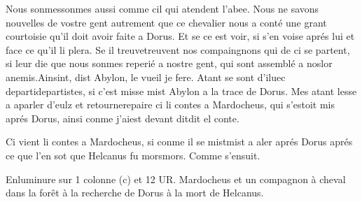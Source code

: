 \documentclass{article}
\begin{document}
\begin{pages}
   Nous sonmessonmes aussi comme cil qui 
      atendent l’abee. Nous ne savons nouvelles de vostre gent autrement que 
      ce chevalier nous a conté une grant courtoisie qu’il doit avoir 
         faite a Dorus. Et se ce est voir, si s’en voise aprés lui et face ce qu’il li plera. 
      Se il treuvetreuvent nos compaingnons qui de ci se partent, si leur die 
      que nous sonmes reperié a nostre gent, qui sont assemblé a noslor anemis.Ainsint, dist Abylon, le vueil je fere.
   Atant se sont d’iluec departidepartistes, si c’est misse mist 
   Abylon a la trace de 
   Dorus. 
   Mes atant lesse a aparler d’eulz et 
      retournerepaire ci 
      li contes a 
   Mardocheus, qui s’estoit mis aprés Dorus, 
   ainsi conme j’aiest devant 
      ditdit el conte. \pend
         
Ci vient li contes a Mardocheus, si conme il se 
   mistmist a aler aprés Dorus aprés ce que 
   l’en sot que Helcanus fu 
   morsmors. Comme s'ensuit.

   Enluminure sur 1 colonne (c) et 12 UR.
      Mardocheus et un compagnon à cheval dans la forêt à 
      la recherche de Dorus à la mort de Helcanus.
   


\end{pages}
\end{document}
